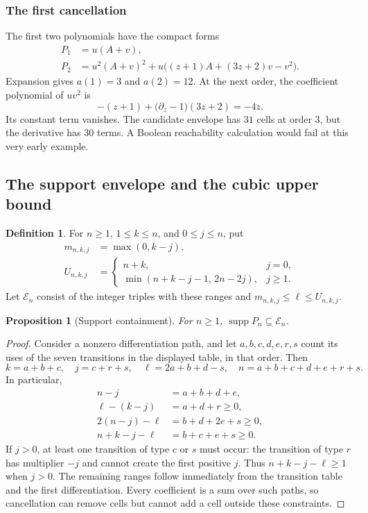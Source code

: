 \documentclass[11pt,a4paper]{article}
\numberwithin{equation}{section}
\newtheorem{proposition}[theorem]{Proposition}
\theoremstyle{definition}
\newtheorem{definition}[theorem]{Definition}
\theoremstyle{remark}
\theoremstyle{plain}
\DeclareMathOperator{\supp}{supp}
\begin{document}
\subsubsection{The first cancellation}

The first two polynomials have the compact forms
\begin{align}
 P_1&=u(A+v),\label{xxc:eq:P1}\\
 P_2&=u^2(A+v)^2+
 u\bigl((z+1)A+(3z+2)v-v^2\bigr).\label{xxc:eq:P2}
\end{align}
Expansion gives $a(1)=3$ and $a(2)=12$. At the next order, the coefficient
polynomial of $uv^2$ is
\[
 -(z+1)+\bigl(\partial_z-1\bigr)(3z+2)=-4z.
\]
Its constant term vanishes. The candidate envelope has $31$ cells at order
$3$, but the derivative has $30$ terms. A Boolean reachability calculation
would fail at this very early example.

\subsection{The support envelope and the cubic upper bound}

\begin{definition}
For $n\ge1$, $1\le k\le n$, and $0\le j\le n$, put
\begin{align}
 m_{n,k,j}&=\max(0,k-j),\label{xxc:eq:lo}\\
 U_{n,k,j}&=
 \begin{cases}
 n+k,&j=0,\\
 \min(n+k-j-1,\,2n-2j),&j\ge1.
 \end{cases}\label{xxc:eq:hi}
\end{align}
Let $\mathcal E_n$ consist of the integer triples with these ranges and
$m_{n,k,j}\le\ell\le U_{n,k,j}$.
\end{definition}

\begin{proposition}[Support containment]\label{xxc:prop:envelope}
For $n\ge1$, $\supp P_n\subseteq\mathcal E_n$.
\end{proposition}
\begin{proof}
Consider a nonzero differentiation path, and let $a,b,c,d,e,r,s$ count its
uses of the seven transitions in the displayed table, in that order. Then
\[
 k=a+b+c,\quad j=c+r+s,\quad
 \ell=2a+b+d-s,\quad
 n=a+b+c+d+e+r+s.
\]
In particular,
\begin{align*}
 n-j&=a+b+d+e,\\
 \ell-(k-j)&=a+d+r\ge0,\\
 2(n-j)-\ell&=b+d+2e+s\ge0,\\
 n+k-j-\ell&=b+c+e+s\ge0.
\end{align*}
If $j>0$, at least one transition of type $c$ or $s$ must occur: the transition
of type $r$ has multiplier $-j$ and cannot create the first positive $j$.
Thus $n+k-j-\ell\ge1$ when $j>0$. The remaining ranges follow immediately
from the transition table and the first differentiation. Every coefficient
is a sum over such paths, so cancellation can remove cells but cannot add a
cell outside these constraints.
\end{proof}
\end{document}
